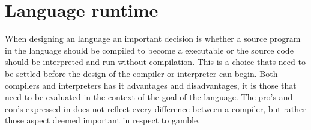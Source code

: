 \chapter{Language runtime}
When designing an language an important decision is whether a source program in the language should be compiled to become a executable or the source code should be interpreted and run without compilation.
This is a choice thats need to be settled before the design of the compiler or interpreter can begin.
Both compilers and interpreters has it advantages and disadvantages, it is those that need to be evaluated in the context of the goal of the language.
The pro's and con's expressed in  does not reflect every difference between a compiler, but rather those aspect deemed important in respect to \gls{gamble}.

